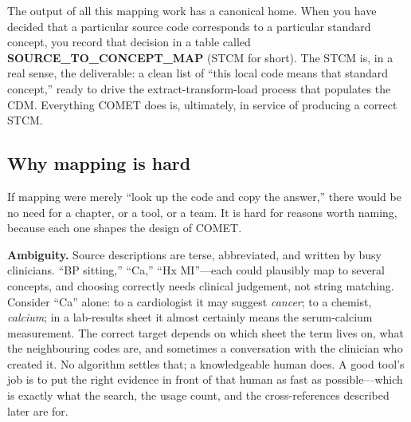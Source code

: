 \documentclass[12pt,openany]{book}
\newcommand{\code}[1]{{\ttfamily\small #1}}
\begin{document}
\begin{center}
\end{center}

The output of all this mapping work has a canonical home. When you have decided that a particular
source code corresponds to a particular standard concept, you record that decision in a table called
\textbf{\code{SOURCE\_TO\_CONCEPT\_MAP}} (STCM for short). The STCM is, in a real sense, the
deliverable: a clean list of ``this local code means that standard concept,'' ready to drive the
extract-transform-load process that populates the CDM. Everything COMET does is, ultimately, in
service of producing a correct STCM.

\subsection{Why mapping is hard}

If mapping were merely ``look up the code and copy the answer,'' there would be no need for a chapter,
or a tool, or a team. It is hard for reasons worth naming, because each one shapes the design of
COMET.

\textbf{Ambiguity.} Source descriptions are terse, abbreviated, and written by busy clinicians. ``BP
sitting,'' ``Ca,'' ``Hx MI''---each could plausibly map to several concepts, and choosing correctly
needs clinical judgement, not string matching. Consider ``Ca'' alone: to a cardiologist it may suggest
\emph{cancer}; to a chemist, \emph{calcium}; in a lab-results sheet it almost certainly means the
serum-calcium measurement. The correct target depends on which sheet the term lives on, what the
neighbouring codes are, and sometimes a conversation with the clinician who created it. No algorithm
settles that; a knowledgeable human does. A good tool's job is to put the right evidence in front of
that human as fast as possible---which is exactly what the search, the usage count, and the
cross-references described later are for.
\end{document}
